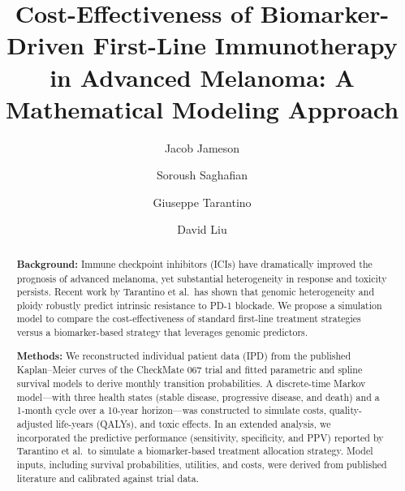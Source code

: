 \documentclass[preprint, 3p,
authoryear]{elsarticle} %
\begin{document}
\begin{frontmatter}

  \title{Cost-Effectiveness of Biomarker-Driven First-Line Immunotherapy
in Advanced Melanoma: A Mathematical Modeling Approach}
    \author[Harvard University]{Jacob Jameson%
  }
    \author[Harvard University]{Soroush Saghafian%
  }
  
    \author[Dana Farber Cancer Institute]{Giuseppe Tarantino%
  }
  
    \author[Dana Farber Cancer Institute]{David Liu%
  }
  
  
  \begin{abstract}
  \textbf{Background:} Immune checkpoint inhibitors (ICIs) have
  dramatically improved the prognosis of advanced melanoma, yet
  substantial heterogeneity in response and toxicity persists. Recent
  work by Tarantino et al.~has shown that genomic heterogeneity and
  ploidy robustly predict intrinsic resistance to PD-1 blockade. We
  propose a simulation model to compare the cost-effectiveness of
  standard first-line treatment strategies versus a biomarker-based
  strategy that leverages genomic predictors.

  \textbf{Methods:} We reconstructed individual patient data (IPD) from
  the published Kaplan--Meier curves of the CheckMate 067 trial and
  fitted parametric and spline survival models to derive monthly
  transition probabilities. A discrete-time Markov model---with three
  health states (stable disease, progressive disease, and death) and a
  1-month cycle over a 10-year horizon---was constructed to simulate
  costs, quality-adjusted life-years (QALYs), and toxic effects. In an
  extended analysis, we incorporated the predictive performance
  (sensitivity, specificity, and PPV) reported by Tarantino et al.~to
  simulate a biomarker-based treatment allocation strategy. Model
  inputs, including survival probabilities, utilities, and costs, were
  derived from published literature and calibrated against trial data.


\end{abstract}
\end{frontmatter}
\end{document}
